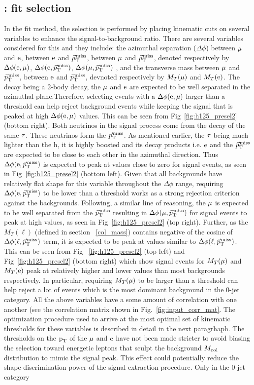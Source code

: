 \subsection{\hmue: \mcol fit selection}
\label{h125_cb_sel}
In the \mcol fit method, the selection is performed by placing kinematic cuts on several variables to enhance the signal-to-background ratio. There are several variables considered for this and they include: the azimuthal separation ($\Delta\phi$) between $\mu$ and $\text{e}$, between $\text{e}$ and ${\vec p}_{\mathrm{T}}^{\kern1pt\text{miss}}$, between $\mu$ and ${\vec p}_{\mathrm{T}}^{\kern1pt\text{miss}}$, denoted respectively by $\Delta\phi(\text{e}, \mu)$, $\Delta\phi(\text{e}, {\vec p}_{\mathrm{T}}^{\kern1pt\text{miss}})$, $\Delta\phi(\mu, {\vec p}_{\mathrm{T}}^{\kern1pt\text{miss}})$ , and the transverse mass between $\mu$ and ${\vec p}_{\mathrm{T}}^{\kern1pt\text{miss}}$, between $\text{e}$ and ${\vec p}_{\mathrm{T}}^{\kern1pt\text{miss}}$, devnoted respectively by $M_T(\mu)$ and $M_T(\text{e})$. The \hmue decay being a 2-body decay, the $\mu$ and $\text{e}$ are expected to be well separated in the azimuthal plane.Therefore, selecting events with a $\Delta\phi(\text{e}, \mu)$ larger than a threshold can help reject background events while keeping the signal that is peaked at high $\Delta\phi(\text{e}, \mu)$ values. This can be seen from Fig~\ref{fig:h125_presel2} (bottom right). Both neutrinos in the signal process come from the decay of the same $\tau$. These neutrinos form the ${\vec p}_{\mathrm{T}}^{\kern1pt\text{miss}}$. As mentioned earlier, the $\tau$ being much lighter than the h, it is highly boosted and its decay products i.e. $\text{e}$ and the ${\vec p}_{\mathrm{T}}^{\kern1pt\text{miss}}$ are expected to be close to each other in the azimuthal direction. Thus $\Delta\phi(\text{e}, {\vec p}_{\mathrm{T}}^{\kern1pt\text{miss}})$ is expected to peak at values close to zero for signal events, as seen in Fig~\ref{fig:h125_presel2} (bottom left). Given that all backgrounds have relatively flat shape for this variable  throughout the $\Delta\phi$ range, requiring $\Delta\phi(\text{e}, {\vec p}_{\mathrm{T}}^{\kern1pt\text{miss}})$ to be lower than a threshold works as a strong rejection criterion against the backgrounds. Following, a similar line of reasoning, the $\mu$ is expected to be well separated from the ${\vec p}_{\mathrm{T}}^{\kern1pt\text{miss}}$ resulting in $\Delta\phi(\mu, {\vec p}_{\mathrm{T}}^{\kern1pt\text{miss}})$ for signal events to peak at high values, as seen in Fig~\ref{fig:h125_presel2} (top right). Further, as the $M_T(\ell)$ (defined in section ~\ref{col_mass}) contains negative of the cosine of $\Delta\phi(\ell, {\vec p}_{\mathrm{T}}^{\kern1pt\text{miss}})$ term, it is expected to be peak at values similar to $\Delta\phi(\ell, {\vec p}_{\mathrm{T}}^{\kern1pt\text{miss}})$. This can be seen from Fig ~\ref{fig:h125_presel2} (top left) and Fig~\ref{fig:h125_presel2} (bottom right) which show signal events for $M_T(\mu)$ and $M_T(\text{e})$ peak at relatively higher and lower values than most backgrounds respectively. In particular, requiring $M_T(\mu)$ to be larger than a threshold can help reject a lot of \ztt events which is the most dominant background in the 0-jet category. All the above variables have a some amount of correlation with one another (see the correlation matrix shown in Fig.~\ref{fig:input_corr_mat}. The optimization procedure used to arrive at the most optimal set of kinematic thresholds for these variables is described in detail in the next paragrhaph. The thresholds on the $\text{p}_\text{T}$ of the $\mu$ and $\text{e}$ have not been made stricter to avoid biasing the selection toward energetic leptons that sculpt the background $M_{\text{col}}$ distribution to mimic the signal peak. This effect could potentially reduce the shape discrimination power of the signal extraction procedure. Only in the 0-jet category 
